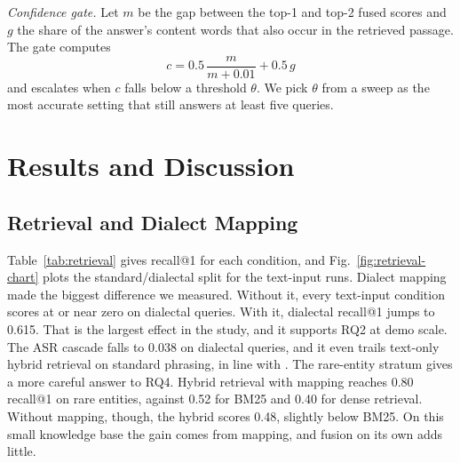 \documentclass[conference]{IEEEtran}
\begin{document}
\textit{Confidence gate.} Let $m$ be the gap between the top-1 and top-2 fused scores and $g$ the share of the answer's content words that also occur in the retrieved passage. The gate computes
\begin{equation}
c = 0.5\,\frac{m}{m + 0.01} + 0.5\,g
\end{equation}
and escalates when $c$ falls below a threshold $\theta$. We pick $\theta$ from a sweep as the most accurate setting that still answers at least five queries.

\section{Results and Discussion}\label{sec:results}

\subsection{Retrieval and Dialect Mapping}
Table~\ref{tab:retrieval} gives recall@1 for each condition, and Fig.~\ref{fig:retrieval-chart} plots the standard/dialectal split for the text-input runs. Dialect mapping made the biggest difference we measured. Without it, every text-input condition scores at or near zero on dialectal queries. With it, dialectal recall@1 jumps to 0.615. That is the largest effect in the study, and it supports RQ2 at demo scale. The ASR cascade falls to 0.038 on dialectal queries, and it even trails text-only hybrid retrieval on standard phrasing, in line with \cite{benchmarkingasr2026,dialectmatters2026}. The rare-entity stratum gives a more careful answer to RQ4. Hybrid retrieval with mapping reaches 0.80 recall@1 on rare entities, against 0.52 for BM25 and 0.40 for dense retrieval. Without mapping, though, the hybrid scores 0.48, slightly below BM25. On this small knowledge base the gain comes from mapping, and fusion on its own adds little.
\end{document}
